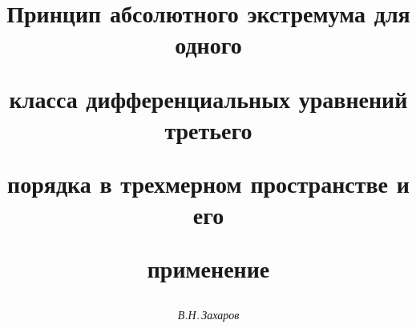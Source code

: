 

 




 


\newcommand{\tts}[1]{} 


 




\setcounter{page}{29} 












 


\author{\it В.Н.\,Захаров} 




\title{Принцип абсолютного экстремума для одного  


класса дифференциальных уравнений третьего  


порядка в трехмерном пространстве и его  


применение} 


 


\date{} 




\pagestyle{plain} %


 




\maketitle 


